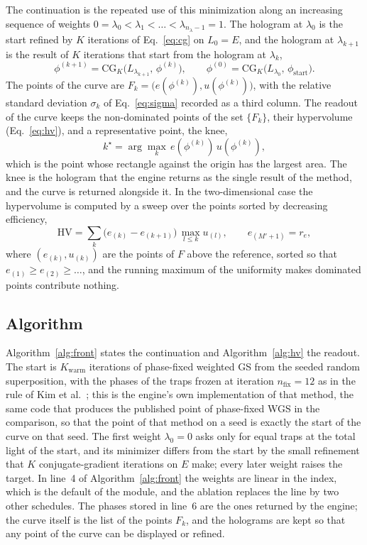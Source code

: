 The continuation is the repeated use of this minimization along an increasing sequence of weights $0=\lambda_0<\lambda_1<\dots<\lambda_{n_\lambda-1}=1$. The hologram at $\lambda_0$ is the start refined by $K$ iterations of Eq.~\ref{eq:cg} on $L_0=E$, and the hologram at $\lambda_{k+1}$ is the result of $K$ iterations that start from the hologram at $\lambda_k$,
\begin{equation}
\phi^{(k+1)}=\mathrm{CG}_K\big(L_{\lambda_{k+1}},\,\phi^{(k)}\big),\qquad \phi^{(0)}=\mathrm{CG}_K\big(L_{\lambda_0},\,\phi_{\mathrm{start}}\big).\label{eq:continuation}
\end{equation}
The points of the curve are $F_k=\big(e(\phi^{(k)}),u(\phi^{(k)})\big)$, with the relative standard deviation $\sigma_k$ of Eq.~\ref{eq:sigma} recorded as a third column. The readout of the curve keeps the non-dominated points of the set $\{F_k\}$, their hypervolume (Eq.~\ref{eq:hv}), and a representative point, the knee,
\begin{equation}
k^{\star}=\arg\max_k\,e(\phi^{(k)})\,u(\phi^{(k)}),\label{eq:knee}
\end{equation}
which is the point whose rectangle against the origin has the largest area. The knee is the hologram that the engine returns as the single result of the method, and the curve is returned alongside it. In the two-dimensional case the hypervolume is computed by a sweep over the points sorted by decreasing efficiency,
\begin{equation}
\mathrm{HV}=\sum_{k}\big(e_{(k)}-e_{(k+1)}\big)\,\max_{l\le k}u_{(l)},\qquad e_{(M'+1)}=r_e,\label{eq:hvsweep}
\end{equation}
where $(e_{(k)},u_{(k)})$ are the points of $F$ above the reference, sorted so that $e_{(1)}\ge e_{(2)}\ge\dots$, and the running maximum of the uniformity makes dominated points contribute nothing.

\subsection{Algorithm}\label{sec:algorithm}

Algorithm~\ref{alg:front} states the continuation and Algorithm~\ref{alg:hv} the readout. The start is $K_{\mathrm{warm}}$ iterations of phase-fixed weighted GS from the seeded random superposition, with the phases of the traps frozen at iteration $n_{\mathrm{fix}}=12$ as in the rule of Kim et al.~\cite{kim2019};
this is the engine's own implementation of that method, the same code that produces the published point of phase-fixed WGS in the comparison, so that the point of that method on a seed is exactly the start of the curve on that seed. The first weight $\lambda_0=0$ asks only for equal traps at the total light of the start, and its minimizer differs from the start by the small refinement that $K$ conjugate-gradient iterations on $E$ make; every later weight raises the target.
In line~4 of Algorithm~\ref{alg:front} the weights are linear in the index, which is the default of the module, and the ablation replaces the line by two other schedules. The phases stored in line~6 are the ones returned by the engine; the curve itself is the list of the points $F_k$, and the holograms are kept so that any point of the curve can be displayed or refined.

